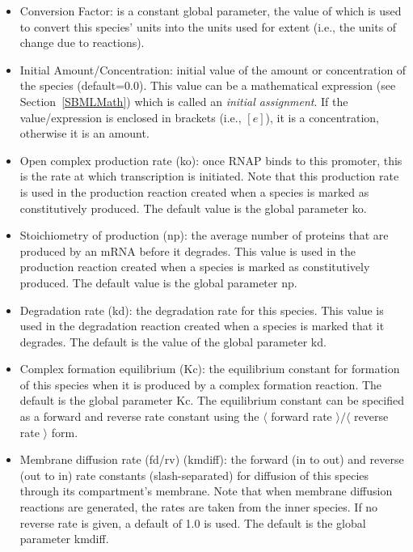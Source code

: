 \documentclass[titlepage,11pt]{article}
\begin{document}
\begin{itemize}
\item Conversion Factor: is a constant global parameter, the value of which is used to convert this species' units into the units used for extent (i.e., the units of change due to reactions).
\item Initial Amount/Concentration: initial value of the amount or concentration of the species (default=0.0).  This value can be a mathematical expression (see Section~\ref{SBMLMath}) which is called an \emph{initial assignment}.  If the value/expression is enclosed in brackets (i.e., $[e]$), it is a concentration, otherwise it is an amount.  
\item Open complex production rate (ko): once RNAP binds to this promoter, this is the rate at which transcription is initiated.  Note that this production rate is used in the production reaction created when a species is marked as constitutively produced.  The default value is the global parameter ko.
\item Stoichiometry of production (np): the average number of proteins that are produced by an mRNA before it degrades.  This value is used in the production reaction created when a species is marked as constitutively produced.  The default value is the global parameter np.
\item Degradation rate (kd): the degradation rate for this species.  This value is used in the degradation reaction created when a species is marked that it degrades.  The default is the value of the global parameter kd.  
\item Complex formation equilibrium (Kc): the equilibrium constant for formation of this species when it is produced by a complex formation reaction.  The default is the global parameter Kc.  The equilibrium constant can be specified as a forward and reverse rate constant using the $\langle$ forward rate $\rangle / \langle$ reverse rate $\rangle$ form.
\item Membrane diffusion rate (fd/rv) (kmdiff): the forward (in to out) and reverse (out to in) rate constants (slash-separated) for diffusion of this species through its compartment's membrane.  Note that when membrane diffusion reactions are generated, the rates are taken from the inner species.  If no reverse rate is given, a default of 1.0 is used.  The default is the global parameter kmdiff.

\end{itemize}
\end{document}

